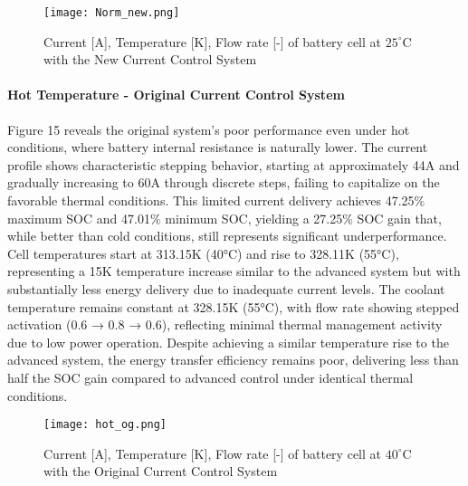 \documentclass[conference]{IEEEtran}
\begin{document}
\begin{figure}[H]
    \centering
    \texttt{[image: Norm\_new.png]}
    \caption{Current [A], Temperature [K], Flow rate [-] of battery cell at $25^\circ$C with the New Current Control System }
    \label{fig:enter-label}
\end{figure}

\paragraph{\textbf{Hot Temperature - Original Current Control System}}
Figure 15 reveals the original system's poor performance even under hot conditions, where battery internal resistance is naturally lower. The current profile shows characteristic stepping behavior, starting at approximately 44A and gradually increasing to 60A through discrete steps, failing to capitalize on the favorable thermal conditions. This limited current delivery achieves 47.25$\%$ maximum SOC and 47.01$\%$ minimum SOC, yielding a 27.25$\%$ SOC gain that, while better than cold conditions, still represents significant underperformance.
Cell temperatures start at 313.15K (40°C) and rise to 328.11K (55°C), representing a 15K temperature increase similar to the advanced system but with substantially less energy delivery due to inadequate current levels. The coolant temperature remains constant at 328.15K (55°C), with flow rate showing stepped activation (0.6 → 0.8 → 0.6), reflecting minimal thermal management activity due to low power operation. Despite achieving a similar temperature rise to the advanced system, the energy transfer efficiency remains poor, delivering less than half the SOC gain compared to advanced control under identical thermal conditions.

\begin{figure}[H]
    \centering
    \texttt{[image: hot\_og.png]}
    \caption{Current [A], Temperature [K], Flow rate [-] of battery cell at $40^\circ$C with the Original Current Control System }
    \label{fig:enter-label}
\end{figure}
\end{document}

